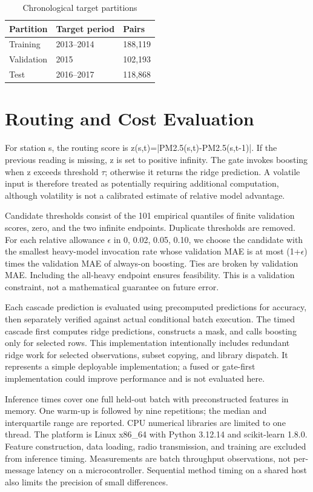 \documentclass[conference,a4paper]{IEEEtran}
\begin{document}
\begin{table}[t]\caption{Chronological target partitions}\centering\begin{tabular}{lll}\toprule Partition & Target period & Pairs\\\midrule Training & 2013--2014 & 188,119\\Validation & 2015 & 102,193\\Test & 2016--2017 & 118,868\\\bottomrule\end{tabular}\end{table}
\section{Routing and Cost Evaluation}
For station s, the routing score is z(s,t)=|PM2.5(s,t)-PM2.5(s,t-1)|. If the previous reading is missing, z is set to positive infinity. The gate invokes boosting when z exceeds threshold $\tau$; otherwise it returns the ridge prediction. A volatile input is therefore treated as potentially requiring additional computation, although volatility is not a calibrated estimate of relative model advantage.

Candidate thresholds consist of the 101 empirical quantiles of finite validation scores, zero, and the two infinite endpoints. Duplicate thresholds are removed. For each relative allowance $\epsilon$ in {0, 0.02, 0.05, 0.10}, we choose the candidate with the smallest heavy-model invocation rate whose validation MAE is at most (1+$\epsilon$) times the validation MAE of always-on boosting. Ties are broken by validation MAE. Including the all-heavy endpoint ensures feasibility. This is a validation constraint, not a mathematical guarantee on future error.

Each cascade prediction is evaluated using precomputed predictions for accuracy, then separately verified against actual conditional batch execution. The timed cascade first computes ridge predictions, constructs a mask, and calls boosting only for selected rows. This implementation intentionally includes redundant ridge work for selected observations, subset copying, and library dispatch. It represents a simple deployable implementation; a fused or gate-first implementation could improve performance and is not evaluated here.

Inference times cover one full held-out batch with preconstructed features in memory. One warm-up is followed by nine repetitions; the median and interquartile range are reported. CPU numerical libraries are limited to one thread. The platform is Linux x86\_64 with Python 3.12.14 and scikit-learn 1.8.0. Feature construction, data loading, radio transmission, and training are excluded from inference timing. Measurements are batch throughput observations, not per-message latency on a microcontroller. Sequential method timing on a shared host also limits the precision of small differences.
\end{document}
